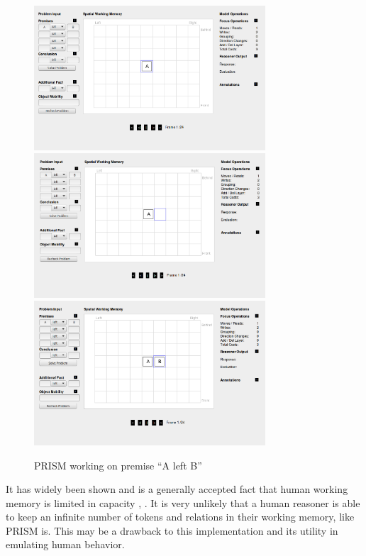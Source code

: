 \documentclass[hidelinks]{scrartcl}
\begin{document}
\begin{figure}[H]
	\caption{PRISM working on premise ``A left B''}
	\label{img:PRISM}
	\centering
	\includegraphics[width=0.77\textwidth]{Illustrations/PRISM1.png}
	\includegraphics[width=0.77\textwidth]{Illustrations/PRISM2.png}
	\includegraphics[width=0.77\textwidth]{Illustrations/PRISM3.png}
\end{figure}

It has widely been shown and is a generally accepted fact that human \gls{working memory} is limited in capacity \citep{Baddeley.2007}, \citep{Miller.1956}. It is very unlikely that a human reasoner is able to keep an infinite number of tokens and relations in their working memory, like PRISM is. This may be a drawback to this implementation and its utility in emulating human behavior. \\
\end{document}
